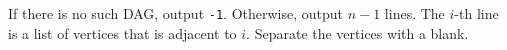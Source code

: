 If there is no such DAG, output \verb+-1+.
Otherwise, output $n-1$ lines.
The $i$-th line is a list of vertices that is adjacent to $i$.
Separate the vertices with a blank.
